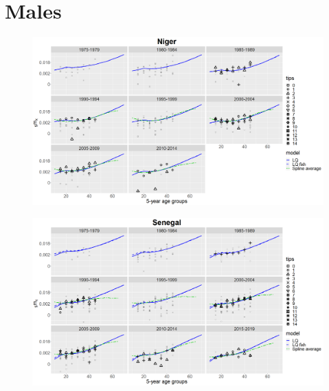\documentclass[12pt,a4paper]{article}
\begin{document}
\newpage
\section*{\centering Males}
\begin{figure}[H]
\includegraphics[width = \linewidth]{Burkina Faso/8/niger males.png}
\end{figure}
\begin{figure}[H]
\includegraphics[width = \linewidth]{Burkina Faso/8/senegal males.png}
\end{figure}

\newpage
\end{document}
